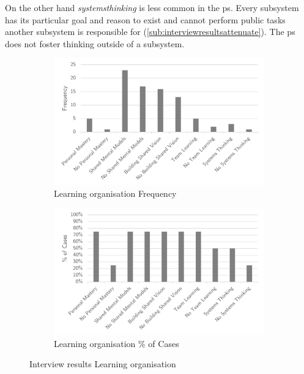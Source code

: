 On the other hand \textit{\gls{systemsthinking}} is less common in the \gls{ps}. Every subsystem has its particular goal and reason to exist and cannot perform public tasks another subsystem is responsible for (\cref{sub:interviewresultsattenuate}). The \gls{ps} does not foster thinking outside of a subsystem.
\begin{figure}[H]
	\centering
	\begin{subfigure}[H]{0.5\textwidth}
		\centering
		\includegraphics[width=0.95\linewidth]{images/learningorganisation_frequency}
		\caption{Learning organisation Frequency}
		\label{fig:learningfrequency}
	\end{subfigure}%
	\begin{subfigure}[H]{0.5\textwidth}
		\centering
		\includegraphics[width=0.95\linewidth]{images/learningorganisation_cases}
		\caption{Learning organisation \% of Cases}
		\label{fig:learningcases}
	\end{subfigure}
	\caption{Interview results Learning organisation}
	\label{fig:interviewlearningorganisation}
\end{figure}

